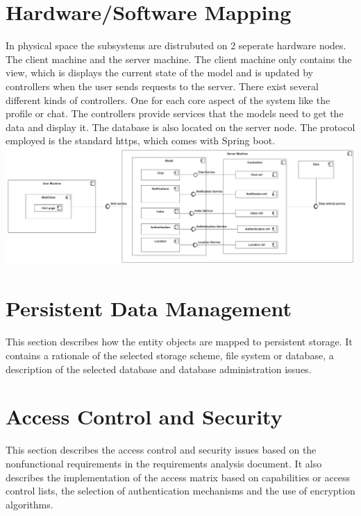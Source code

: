 \documentclass[a4paper,12pt]{scrartcl}
\begin{document}
    \section{Hardware/Software Mapping}
In physical space the subsystems are distrubuted on 2 seperate hardware nodes. The client machine and the server machine. The client machine only contains the view, which is displays the current state of the model and is updated by controllers when the user sends requests to the server. There exist several different kinds of controllers. One for each core aspect of the system like the profile or chat. The controllers provide services that the models need to get the data and display it. The database is also located on the server node. The protocol employed is the standard https, which comes with Spring boot.\\
    
    
    
    \includegraphics[scale=0.15]{HardwareSoftware.png}
    
    


    \section{Persistent Data Management}
    This section describes how the entity objects are mapped to persistent storage.
    It contains a rationale of the selected storage scheme, file system or database, a description of the selected database and database administration issues.


    \section{Access Control and Security}
    This section describes the access control and security issues based on the nonfunctional requirements in the requirements analysis document. It also describes the implementation of the access matrix based on capabilities or access control lists, the selection of authentication mechanisms and the use of encryption algorithms.\\
    
\end{document}
